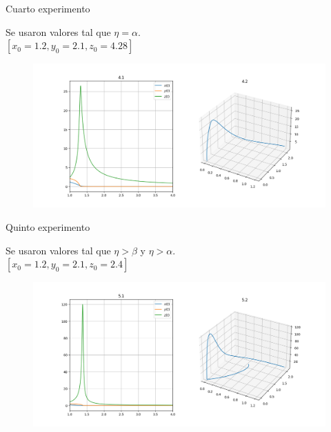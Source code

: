 \documentclass{beamer}
\begin{document}
\begin{frame}
    {Cuarto experimento}

    Se usaron valores tal que $\eta = \alpha$.\\
    $[x_0=1.2, y_0=2.1, z_0=4.28]$

    \begin{figure}[h!]
        \includegraphics[width=\linewidth]{../numerical_models/images/4.png}
    \end{figure}
\end{frame}

\begin{frame}
    {Quinto experimento}

    Se usaron valores tal que $\eta > \beta$ y $\eta > \alpha$.\\
    $[x_0=1.2, y_0=2.1, z_0=2.4]$

    \begin{figure}[h!]
        \includegraphics[width=\linewidth]{../numerical_models/images/5.png}
    \end{figure}
\end{frame}
\end{document}
